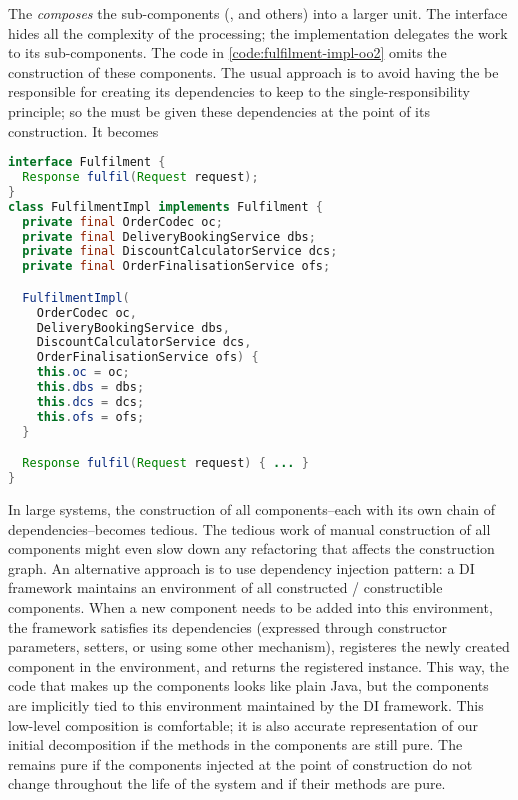 The  \emph{composes} the sub-components (,  and others) into a larger unit. The interface  hides all the complexity of the processing; the implementation  delegates the work to its sub-components. The code in \autoref{code:fulfilment-impl-oo2} omits the construction of these components. The usual approach is to avoid having the  be responsible for creating its dependencies to keep to the single-responsibility principle; so the  must be given these dependencies at the point of its construction. It becomes 

\begin{lstlisting}[caption={Fulfilment OO implementation II}, label={code:fulfilment-impl-oo3}, language=Java, escapechar=|]
interface Fulfilment {
  Response fulfil(Request request);
}
class FulfilmentImpl implements Fulfilment {
  private final OrderCodec oc;
  private final DeliveryBookingService dbs;
  private final DiscountCalculatorService dcs;
  private final OrderFinalisationService ofs;

  FulfilmentImpl(
    OrderCodec oc, 
    DeliveryBookingService dbs,
    DiscountCalculatorService dcs,
    OrderFinalisationService ofs) {
    this.oc = oc;
    this.dbs = dbs;
    this.dcs = dcs;
    this.ofs = ofs;
  }

  Response fulfil(Request request) { ... }
}
\end{lstlisting}

In large systems, the construction of all components--each with its own chain of dependencies--becomes tedious. The tedious work of manual construction of all components might even slow down any refactoring that affects the construction graph. An alternative approach is to use dependency injection pattern: a DI framework maintains an environment of all constructed / constructible components. When a new component needs to be added into this environment, the framework satisfies its dependencies (expressed through constructor parameters, setters, or using some other mechanism), registeres the newly created component in the environment, and returns the registered instance. This way, the code that makes up the components looks like plain Java, but the components are implicitly tied to this environment maintained by the DI framework. This low-level composition is comfortable; it is also accurate representation of our initial decomposition if the methods in the components are still pure. The  remains pure if the components injected at the point of construction do not change throughout the life of the system and if their methods are pure. 

